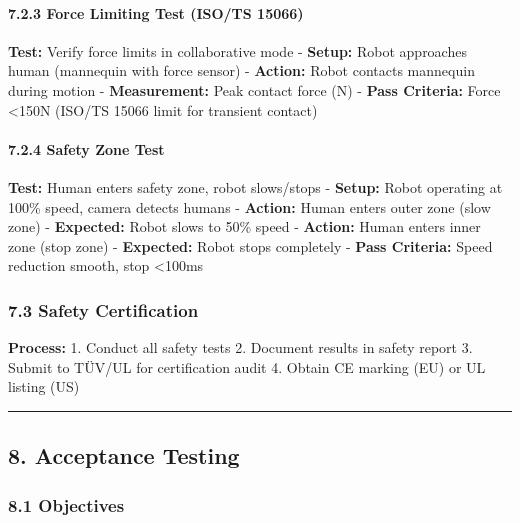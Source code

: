 \documentclass[
]{article}
\begin{document}
\hypertarget{force-limiting-test-isots-15066}{%
\paragraph{7.2.3 Force Limiting Test (ISO/TS
15066)}\label{force-limiting-test-isots-15066}}

\textbf{Test:} Verify force limits in collaborative mode -
\textbf{Setup:} Robot approaches human (mannequin with force sensor) -
\textbf{Action:} Robot contacts mannequin during motion -
\textbf{Measurement:} Peak contact force (N) - \textbf{Pass Criteria:}
Force \textless150N (ISO/TS 15066 limit for transient contact)

\hypertarget{safety-zone-test}{%
\paragraph{7.2.4 Safety Zone Test}\label{safety-zone-test}}

\textbf{Test:} Human enters safety zone, robot slows/stops -
\textbf{Setup:} Robot operating at 100\% speed, camera detects humans -
\textbf{Action:} Human enters outer zone (slow zone) -
\textbf{Expected:} Robot slows to 50\% speed - \textbf{Action:} Human
enters inner zone (stop zone) - \textbf{Expected:} Robot stops
completely - \textbf{Pass Criteria:} Speed reduction smooth, stop
\textless100ms

\hypertarget{safety-certification}{%
\subsubsection{7.3 Safety Certification}\label{safety-certification}}

\textbf{Process:} 1. Conduct all safety tests 2. Document results in
safety report 3. Submit to TÜV/UL for certification audit 4. Obtain CE
marking (EU) or UL listing (US)

\begin{center}\rule{0.5\linewidth}{0.5pt}\end{center}

\hypertarget{acceptance-testing}{%
\subsection{8. Acceptance Testing}\label{acceptance-testing}}

\hypertarget{objectives-5}{%
\subsubsection{8.1 Objectives}\label{objectives-5}}
\end{document}

